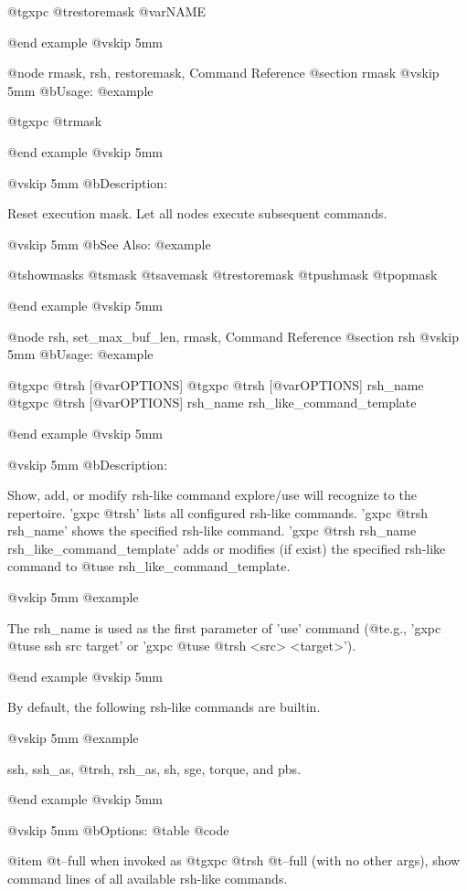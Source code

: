   @t{gxpc} @t{restoremask} @var{NAME}

@end example
@vskip 5mm

@node rmask, rsh, restoremask, Command Reference
@section rmask
@vskip 5mm
@b{Usage:}
@example

  @t{gxpc} @t{rmask}

@end example
@vskip 5mm

@vskip 5mm
@b{Description:}


  Reset execution mask. Let all nodes execute subsequent commands.

@vskip 5mm
@b{See Also:}
@example

  @t{showmasks} @t{smask} @t{savemask} @t{restoremask} @t{pushmask} @t{popmask}

@end example
@vskip 5mm

@node rsh, set_max_buf_len, rmask, Command Reference
@section rsh
@vskip 5mm
@b{Usage:}
@example

  @t{gxpc} @t{rsh} [@var{OPTIONS}]
  @t{gxpc} @t{rsh} [@var{OPTIONS}] rsh_name
  @t{gxpc} @t{rsh} [@var{OPTIONS}] rsh_name rsh_like_command_template

@end example
@vskip 5mm

@vskip 5mm
@b{Description:}


  Show, add, or modify rsh-like command explore/use will recognize
  to the repertoire.
  'gxpc @t{rsh}' lists all configured rsh-like commands.
  'gxpc @t{rsh} rsh_name' shows the specified rsh-like command.
  'gxpc @t{rsh} rsh_name rsh_like_command_template' adds or modifies (if exist)
  the specified rsh-like command to @t{use} rsh_like_command_template.

@vskip 5mm
@example

  The rsh_name is used as the first parameter of 'use' command (@t{e}.g.,
  'gxpc @t{use} ssh src target' or 'gxpc @t{use} @t{rsh} <src> <target>').

@end example
@vskip 5mm

  By default, the following rsh-like commands are builtin.

@vskip 5mm
@example

  ssh, ssh_as, @t{rsh}, rsh_as, sh, sge, torque, and pbs.

@end example
@vskip 5mm

@vskip 5mm
@b{Options:}
@table @code

@item   @t{--full}
    when invoked as @t{gxpc} @t{rsh} @t{--full} (with no other args),
    show command lines of all available rsh-like commands.

